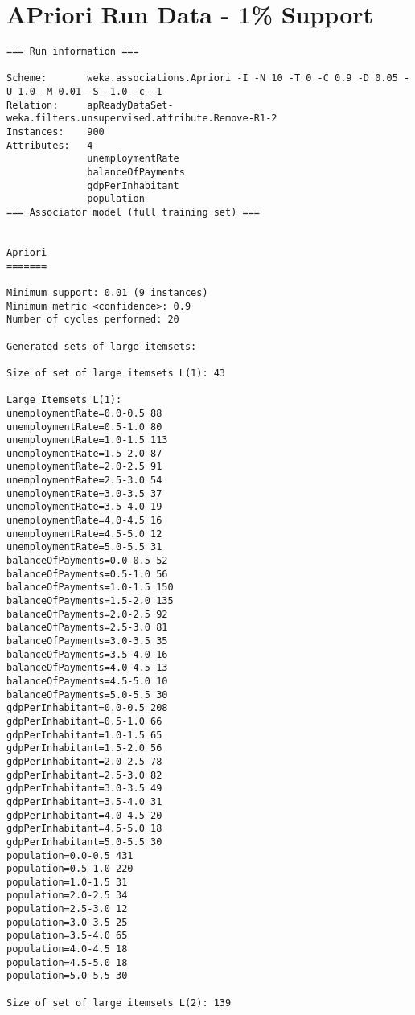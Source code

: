 \section{APriori Run Data - 1\% Support}
\begin{lstlisting}[basicstyle=\footnotesize\ttfamily,numbers=none]
=== Run information ===

Scheme:       weka.associations.Apriori -I -N 10 -T 0 -C 0.9 -D 0.05 -U 1.0 -M 0.01 -S -1.0 -c -1
Relation:     apReadyDataSet-weka.filters.unsupervised.attribute.Remove-R1-2
Instances:    900
Attributes:   4
              unemploymentRate
              balanceOfPayments
              gdpPerInhabitant
              population
=== Associator model (full training set) ===


Apriori
=======

Minimum support: 0.01 (9 instances)
Minimum metric <confidence>: 0.9
Number of cycles performed: 20

Generated sets of large itemsets:

Size of set of large itemsets L(1): 43

Large Itemsets L(1):
unemploymentRate=0.0-0.5 88
unemploymentRate=0.5-1.0 80
unemploymentRate=1.0-1.5 113
unemploymentRate=1.5-2.0 87
unemploymentRate=2.0-2.5 91
unemploymentRate=2.5-3.0 54
unemploymentRate=3.0-3.5 37
unemploymentRate=3.5-4.0 19
unemploymentRate=4.0-4.5 16
unemploymentRate=4.5-5.0 12
unemploymentRate=5.0-5.5 31
balanceOfPayments=0.0-0.5 52
balanceOfPayments=0.5-1.0 56
balanceOfPayments=1.0-1.5 150
balanceOfPayments=1.5-2.0 135
balanceOfPayments=2.0-2.5 92
balanceOfPayments=2.5-3.0 81
balanceOfPayments=3.0-3.5 35
balanceOfPayments=3.5-4.0 16
balanceOfPayments=4.0-4.5 13
balanceOfPayments=4.5-5.0 10
balanceOfPayments=5.0-5.5 30
gdpPerInhabitant=0.0-0.5 208
gdpPerInhabitant=0.5-1.0 66
gdpPerInhabitant=1.0-1.5 65
gdpPerInhabitant=1.5-2.0 56
gdpPerInhabitant=2.0-2.5 78
gdpPerInhabitant=2.5-3.0 82
gdpPerInhabitant=3.0-3.5 49
gdpPerInhabitant=3.5-4.0 31
gdpPerInhabitant=4.0-4.5 20
gdpPerInhabitant=4.5-5.0 18
gdpPerInhabitant=5.0-5.5 30
population=0.0-0.5 431
population=0.5-1.0 220
population=1.0-1.5 31
population=2.0-2.5 34
population=2.5-3.0 12
population=3.0-3.5 25
population=3.5-4.0 65
population=4.0-4.5 18
population=4.5-5.0 18
population=5.0-5.5 30

Size of set of large itemsets L(2): 139


\end{lstlisting}
